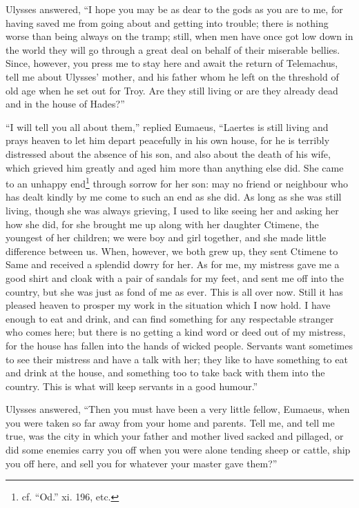 Ulysses answered, “I hope you may be as dear to the gods as you are to me, for
having saved me from going about and getting into trouble; there is nothing
worse than being always on the tramp; still, when men have once got low down in
the world they will go through a great deal on behalf of their miserable
bellies. Since, however, you press me to stay here and await the return of
Telemachus, tell me about Ulysses’ mother, and his father whom he left on the
threshold of old age when he set out for Troy. Are they still living or are
they already dead and in the house of Hades?”

“I will tell you all about them,” replied Eumaeus, “Laertes is still living and
prays heaven to let him depart peacefully in his own house, for he is terribly
distressed about the absence of his son, and also about the death of his wife,
which grieved him greatly and aged him more than anything else did. She came to
an unhappy end\footnote{cf. “Od.” xi. 196, etc.} through sorrow for her son: may no
friend or neighbour who has dealt kindly by me come to such an end as she did.
As long as she was still living, though she was always grieving, I used to like
seeing her and asking her how she did, for she brought me up along with her
daughter Ctimene, the youngest of her children; we were boy and girl together,
and she made little difference between us. When, however, we both grew up, they
sent Ctimene to Same and received a splendid dowry for her. As for me, my
mistress gave me a good shirt and cloak with a pair of sandals for my feet, and
sent me off into the country, but she was just as fond of me as ever. This is
all over now. Still it has pleased heaven to prosper my work in the situation
which I now hold. I have enough to eat and drink, and can find something for
any respectable stranger who comes here; but there is no getting a kind word or
deed out of my mistress, for the house has fallen into the hands of wicked
people. Servants want sometimes to see their mistress and have a talk with her;
they like to have something to eat and drink at the house, and something too to
take back with them into the country. This is what will keep servants in a good
humour.”

Ulysses answered, “Then you must have been a very little fellow, Eumaeus, when
you were taken so far away from your home and parents. Tell me, and tell me
true, was the city in which your father and mother lived sacked and pillaged,
or did some enemies carry you off when you were alone tending sheep or cattle,
ship you off here, and sell you for whatever your master gave them?”


